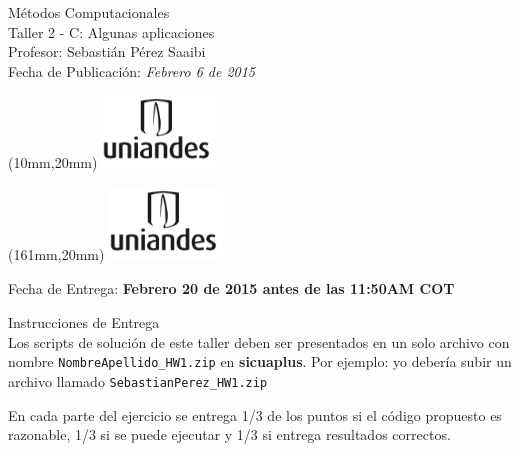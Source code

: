 \documentclass[11pt,letterpaper]{exam}
\begin{document}
\begin{center}
{\Large Métodos Computacionales} \\
Taller 2 - \textsc{C}: Algunas aplicaciones \\
Profesor: Sebastián Pérez Saaibi\\
Fecha de Publicación: {\small \it Febrero 6 de 2015}\\
\end{center}

\begin{textblock*}{40mm}(10mm,20mm)
  \includegraphics[width=3cm]{logoUniandes.png}
\end{textblock*}

\begin{textblock*}{40mm}(161mm,20mm)
  \includegraphics[width=3cm]{logoUniandes.png}
\end{textblock*}

\vspace{0.5cm}

{\Large Fecha de Entrega:  \bf Febrero 20 de 2015 antes de las 11:50AM COT}

\vspace{0.5cm}

{\Large Instrucciones de Entrega}\\

Los scripts de solución de este taller deben ser presentados en un solo archivo con nombre \verb+NombreApellido_HW1.zip+ en \textbf{sicuaplus}. Por ejemplo: yo deber\'ia subir un archivo llamado \verb"SebastianPerez_HW1.zip"

En cada parte del ejercicio se entrega 1/3  de los puntos si el código propuesto es razonable, 1/3 si se puede ejecutar y 1/3 si entrega resultados correctos.


\vspace{0.5cm}
\end{document}
